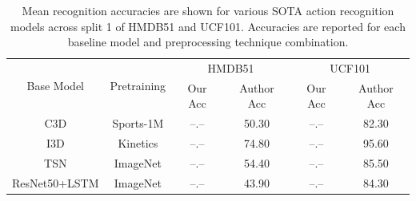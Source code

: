 \documentclass{llncs}
\begin{document}
\begin{table}[tp!]
\begin{center}
\caption{Mean recognition accuracies are shown for various SOTA action recognition models across split 1 of HMDB51 and UCF101. 
Accuracies are reported for each baseline model and preprocessing technique combination.}
\label{tab:model_results}
\begin{tabular}{c|c|c|c||c|c}
\hline
\multirow{2}{*}{Base Model} & \multirow{2}{*}{Pretraining} & \multicolumn{2}{c||}{HMDB51} & \multicolumn{2}{c}{UCF101} \\\cline{3-6}
& & Our Acc & Author Acc & Our Acc & Author Acc \\
\hline
C3D & Sports-1M & --.-- & 50.30 & --.-- & 82.30 \\
\hline
I3D & Kinetics & --.-- & 74.80 & --.-- & 95.60 \\
\hline
TSN & ImageNet & --.-- & 54.40 & --.-- & 85.50 \\
\hline
ResNet50+LSTM & ImageNet & --.-- & 43.90 & --.-- & 84.30 \\
\hline
\end{tabular}
\end{center}
\end{table}


\clearpage



\end{document}
